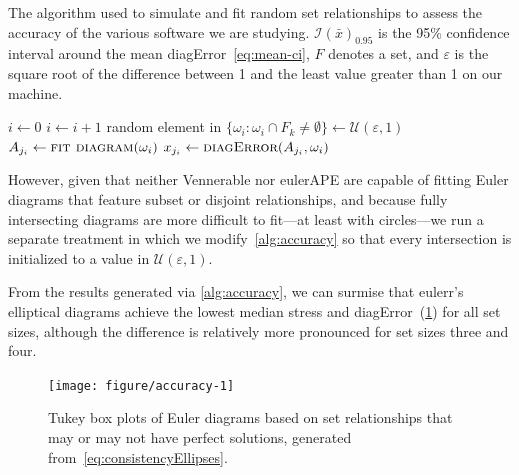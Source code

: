 \documentclass[
  oneside,
  openany,
  numbers=noendperiod,
  parskip=half,
  bibliography=totoc
]{scrbook}\usepackage[]{graphicx}\usepackage{xcolor}
\newenvironment{knitrout}{}{} %
\newcommand{\pkg}[1]{{\fontseries{b}\selectfont #1}}
\begin{document}
\begin{algorithm}[hbtp]
\caption{The algorithm used to simulate and fit random set relationships to assess
the accuracy of the various software we are studying. $\mathcal{I}(\bar{x})_{0.95}$
is the 95\% confidence interval around the mean diagError~\eqref{eq:mean-ci},
$F$ denotes a set, and
$\varepsilon$ is the square root of the
difference between 1 and the least value greater than 1 on our machine.\label{alg:accuracy}}
\begin{algorithmic}
  \State $i \gets 0$
  \Do
    \State $i \gets i + 1$
      \State random element in $\{\omega_i : \omega_i \cap F_k \neq \emptyset\} \gets \mathcal{U}(\varepsilon, 1)$
    \EndFor
      \State $A_{j_i} \gets \Call{fit diagram}{\omega_i}$
      \State $x_{j_i} \gets \Call{diagError}{A_{j_i},\omega_i}$
    \EndFor
\EndFor
\end{algorithmic}
\end{algorithm}

However, given that neither \pkg{Vennerable} nor \pkg{eulerAPE} are capable
of fitting Euler diagrams that feature subset or disjoint relationships, and
because fully intersecting diagrams are more difficult to fit---at least
with circles---we run a separate treatment
in which we modify~\cref{alg:accuracy} so that every intersection
is initialized to a value in $\mathcal{U}(\varepsilon, 1)$.



From the results generated via \cref{alg:accuracy}, we can
surmise that \pkg{eulerr}'s elliptical diagrams achieve the lowest median stress and
diagError~(\cref{fig:accuracy}) for all set sizes, although the difference is
relatively more pronounced for set sizes three and four.

\begin{figure}[hbtp]
\begin{knitrout}\small
{}\color{fgcolor}

{\centering \texttt{[image: figure/accuracy-1]} 

}



\end{knitrout}
\caption{Tukey box plots of Euler diagrams based on set relationships that may
or may not have perfect solutions, generated from~\eqref{eq:consistencyEllipses}.\label{fig:accuracy}}
\end{figure}
\end{document}
